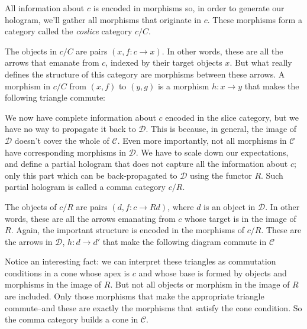 \documentclass[11pt]{amsart}
\begin{document}
All information about $c$ is encoded in morphisms so, in order to generate our hologram, we'll gather all morphisms that originate in $c$. These morphisms form a category called the \emph{coslice} category $c/C$. 

The objects in $c/C$ are pairs $(x, f \colon c \to x)$. In other words, these are all the arrows that emanate from $c$, indexed by their target objects $x$. But what really defines the structure of this category are morphisms between these arrows. A morphism in $c/C$ from $(x, f)$ to $(y, g)$ is a morphism $h \colon x \to y$ that makes the following triangle commute:

\begin{figure}[H]
\centering
\end{figure}

We now have complete information about $c$ encoded in the slice category, but we have no way to propagate it back to $\mathcal D$. This is because, in general, the image of $\mathcal D$ doesn't cover the whole of $\mathcal C$. Even more importantly, not all morphisms in $\mathcal C$ have corresponding morphisms in $\mathcal D$. We have to scale down our expectations, and define a partial hologram that does not capture all the information about $c$; only this part which can be back-propagated to $\mathcal D$ using the functor $R$. Such partial hologram is called a comma category $c/R$.

The objects of $c/R$ are pairs $(d, f \colon c \to R d)$, where $d$ is an object in $\mathcal D$. In other words, these are all the arrows emanating from $c$ whose target is in the image of $R$. Again, the important structure is encoded in the morphisms of $c/R$. These are the arrows in $\mathcal D$, $h \colon d \to d'$ that make the following diagram commute in $\mathcal C$

\begin{figure}[H]
\centering
\end{figure}
Notice an interesting fact: we can interpret these triangles as commutation conditions in a cone whose apex is $c$ and whose base is formed by objects and morphisms in the image of $R$. But not all objects or morphism in the image of $R$ are included. Only those morphisms that make the appropriate triangle commute--and these are exactly the morphisms that satisfy the cone condition. So the comma category builds a cone in $\mathcal C$.
\end{document}
